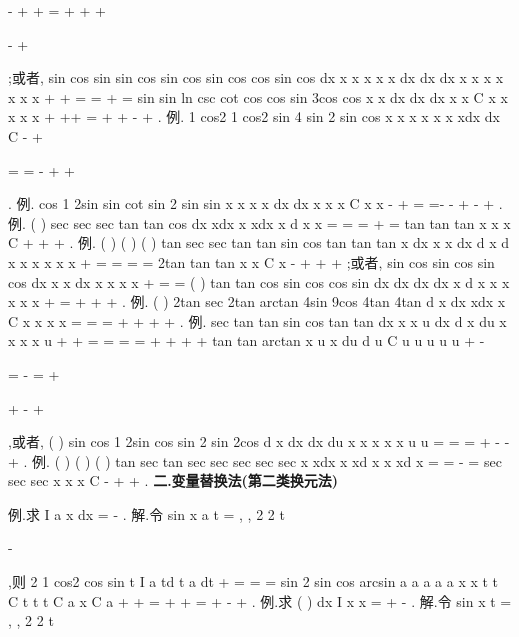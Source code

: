 -
+
+
=
+
+
+


-
+


\int 
;或者, 
sin
cos
sin
sin
cos
sin cos
sin cos
cos
sin cos
dx
x
x
x
x
x
dx
dx
dx
x
x
x
x
x
x
x
+
+
=
=
+
=
\int 
\int 
\int 
\int 
sin
sin
ln csc
cot
cos
cos
sin
3cos
cos
x
x
dx
dx
dx
x
x
C
x
x
x
x
x
+
++
=
+
+
-
+
\int 
\int 
\int 
. 
\textcolor{lyred}{例}.
1 cos2
1 cos2
sin 4
sin 2
sin
cos
x
x
x
x
x
x
xdx
dx
C
-
+



=
=
-
+
+






\int 
\int 
. 
\textcolor{lyred}{例}.
cos
1 2sin
sin
cot
sin 2
sin
sin
x
x
x
x
dx
dx
x
x
x
C
x
x
-
+
=
=-
-
+
-
+
\int 
\int 
. 
\textcolor{lyred}{例}.
(
)
sec
sec
sec
tan
tan
cos
dx
xdx
x
xdx
x
d
x
x =
=
=
+
=
\int 
\int 
\int 
\int 
tan
tan
tan
x
x
x
C
+
+
+
. 
\textcolor{lyred}{例}.
(
)
(
)
(
)
tan
sec
sec
tan
tan
sin
cos
tan
tan
tan
x
dx
x
x
dx
d
x
d
x
x
x
x
x
x
+
=
=
=
=
\int 
\int 
\int 
\int 
2tan
tan
tan
x
x
C
x
-
+
+
+
;或者,
sin
cos
sin
cos
sin
cos
dx
x
x dx
x
x
x
x
+
=
=
\int 
\int 
(
)
tan
tan
cos
sin
cos
cos
sin
dx
dx
dx
dx
x d
x
x
x
x
x
x
+
=
+
+
+
\int 
\int 
\int 
\int 
\int 
. 
\textcolor{lyred}{例}.
(
)
2tan
sec
2tan
arctan
4sin
9cos
4tan
4tan
d
x
dx
xdx
x
C
x
x
x
x
=
=
=
+
+
+
+
\int 
\int 
\int 
. 
\textcolor{lyred}{例}.
sec
tan
tan
sin
cos
tan
tan
dx
x
x
u
dx
d
x
du
x
x
x
x
u
+
+
=
=
=
=
+
+
+
+
\int 
\int 
\int 
\int 
tan
tan
arctan
x
u
x
du
d u
C
u
u
u
u
u
+
-


=
-
=
+






+
-
+




\int 
\int 
,或者, 
(
)
sin
cos
1 2sin
cos
sin 2
sin
2cos
d
x
dx
dx
du
x
x
x
x
x
u
u
=
=
=
+
-
-
+
\int 
\int 
\int 
\int 
. 
\textcolor{lyred}{例}.
(
)
(
)
(
)
tan
sec
tan
sec
sec
sec
sec
sec
x
xdx
x
xd
x
x
xd
x
=
=
-
=
\int 
\int 
\int 
sec
sec
sec
x
x
x
C
-
+
+
. 
\vspace{4pt}
{\bfseries \textcolor{lyred}{二.变量替换法(第二类换元法)}}

\textcolor{lyred}{例}.求
I
a
x dx
=
-
\int 
. 
解.令
sin
x
a
t
=
,
,
2 2
t
\pi \pi 


\in -




,则
2 1 cos2
cos
sin
t
I
a
td
t
a
dt
+
=
=
=
\int 
\int 
sin 2
sin cos
arcsin
a
a
a
a
a
x
x
t
t
C
t
t
t
C
a
x
C
a
+
+
=
+
+
=
+
-
+
. 
\textcolor{lyred}{例}.求
(
)
dx
I
x
x
=
+
-
\int 
. 
解.令
sin
x
t
=
,
,
2 2
t
\pi \pi 


